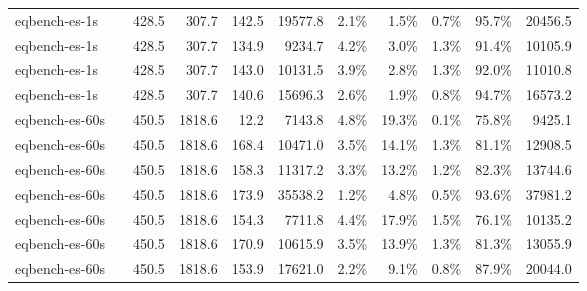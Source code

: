 \begin{tabular}{llrrrrrrrrr}
  {reporttablerow}\label{tabrow:tab-teralizer-stage-runtimes:eqbench-es-1s@3ANAIVE_200_TRIES}eqbench-es-1s & \VariantNaiveC{} & 428.5 & 307.7 & 142.5 & 19577.8 & 2.1\% & 1.5\% & 0.7\% & 95.7\% & 20456.5 \\
  {reporttablerow}\label{tabrow:tab-teralizer-stage-runtimes:eqbench-es-1s@3AIMPROVED_10_TRIES}eqbench-es-1s & \VariantImprovedA{} & 428.5 & 307.7 & 134.9 & 9234.7 & 4.2\% & 3.0\% & 1.3\% & 91.4\% & 10105.9 \\
  {reporttablerow}\label{tabrow:tab-teralizer-stage-runtimes:eqbench-es-1s@3AIMPROVED_50_TRIES}eqbench-es-1s & \VariantImprovedB{} & 428.5 & 307.7 & 143.0 & 10131.5 & 3.9\% & 2.8\% & 1.3\% & 92.0\% & 11010.8 \\
  {reporttablerow}\label{tabrow:tab-teralizer-stage-runtimes:eqbench-es-1s@3AIMPROVED_200_TRIES}eqbench-es-1s & \VariantImprovedC{} & 428.5 & 307.7 & 140.6 & 15696.3 & 2.6\% & 1.9\% & 0.8\% & 94.7\% & 16573.2 \\
  \midrule
  {reporttablerow}\label{tabrow:tab-teralizer-stage-runtimes:eqbench-es-60s@3ABASELINE}eqbench-es-60s & \VariantBaseline{} & 450.5 & 1818.6 & 12.2 & 7143.8 & 4.8\% & 19.3\% & 0.1\% & 75.8\% & 9425.1 \\
  {reporttablerow}\label{tabrow:tab-teralizer-stage-runtimes:eqbench-es-60s@3ANAIVE_10_TRIES}eqbench-es-60s & \VariantNaiveA{} & 450.5 & 1818.6 & 168.4 & 10471.0 & 3.5\% & 14.1\% & 1.3\% & 81.1\% & 12908.5 \\
  {reporttablerow}\label{tabrow:tab-teralizer-stage-runtimes:eqbench-es-60s@3ANAIVE_50_TRIES}eqbench-es-60s & \VariantNaiveB{} & 450.5 & 1818.6 & 158.3 & 11317.2 & 3.3\% & 13.2\% & 1.2\% & 82.3\% & 13744.6 \\
  {reporttablerow}\label{tabrow:tab-teralizer-stage-runtimes:eqbench-es-60s@3ANAIVE_200_TRIES}eqbench-es-60s & \VariantNaiveC{} & 450.5 & 1818.6 & 173.9 & 35538.2 & 1.2\% & 4.8\% & 0.5\% & 93.6\% & 37981.2 \\
  {reporttablerow}\label{tabrow:tab-teralizer-stage-runtimes:eqbench-es-60s@3AIMPROVED_10_TRIES}eqbench-es-60s & \VariantImprovedA{} & 450.5 & 1818.6 & 154.3 & 7711.8 & 4.4\% & 17.9\% & 1.5\% & 76.1\% & 10135.2 \\
  {reporttablerow}\label{tabrow:tab-teralizer-stage-runtimes:eqbench-es-60s@3AIMPROVED_50_TRIES}eqbench-es-60s & \VariantImprovedB{} & 450.5 & 1818.6 & 170.9 & 10615.9 & 3.5\% & 13.9\% & 1.3\% & 81.3\% & 13055.9 \\
  {reporttablerow}\label{tabrow:tab-teralizer-stage-runtimes:eqbench-es-60s@3AIMPROVED_200_TRIES}eqbench-es-60s & \VariantImprovedC{} & 450.5 & 1818.6 & 153.9 & 17621.0 & 2.2\% & 9.1\% & 0.8\% & 87.9\% & 20044.0 \\
  \bottomrule
  \end{tabular}
